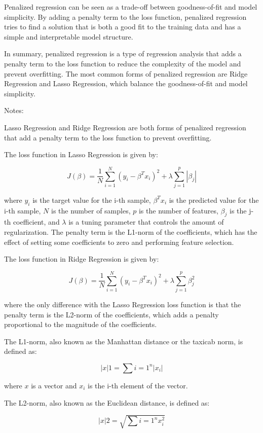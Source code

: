 \documentclass[12pt, a4paper, oneside]{article}
\begin{document}
Penalized regression can be seen as a trade-off between goodness-of-fit and model simplicity. By adding a penalty term to the loss function, penalized regression tries to find a solution that is both a good fit to the training data and has a simple and interpretable model structure.

In summary, penalized regression is a type of regression analysis that adds a penalty term to the loss function to reduce the complexity of the model and prevent overfitting. The most common forms of penalized regression are Ridge Regression and Lasso Regression, which balance the goodness-of-fit and model simplicity.

Notes:

Lasso Regression and Ridge Regression are both forms of penalized regression that add a penalty term to the loss function to prevent overfitting.

The loss function in Lasso Regression is given by:

$$ J(\beta) = \frac{1}{N} \sum_{i=1}^{N} (y_i - \beta^T x_i)^2 + \lambda \sum_{j=1}^{p} |\beta_j| $$

where $y_i$ is the target value for the i-th sample, $\beta^T x_i$ is the predicted value for the i-th sample, $N$ is the number of samples, $p$ is the number of features, $\beta_j$ is the j-th coefficient, and $\lambda$ is a tuning parameter that controls the amount of regularization. The penalty term is the L1-norm of the coefficients, which has the effect of setting some coefficients to zero and performing feature selection.

The loss function in Ridge Regression is given by:

$$ J(\beta) = \frac{1}{N} \sum_{i=1}^{N} (y_i - \beta^T x_i)^2 + \lambda \sum_{j=1}^{p} \beta_j^2 $$

where the only difference with the Lasso Regression loss function is that the penalty term is the L2-norm of the coefficients, which adds a penalty proportional to the magnitude of the coefficients.

The L1-norm, also known as the Manhattan distance or the taxicab norm, is defined as:

$$ \left| x \right|1 = \sum{i=1}^{n} |x_i| $$

where $x$ is a vector and $x_i$ is the i-th element of the vector.

The L2-norm, also known as the Euclidean distance, is defined as:

$$ \left| x \right|2 = \sqrt{\sum{i=1}^{n} x_i^2} $$
\end{document}
